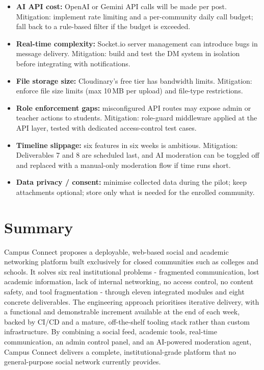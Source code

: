 \documentclass[11pt,a4paper]{article}
\begin{document}
\begin{itemize}[leftmargin=0.7cm]
    \item \textbf{AI API cost:} OpenAI or Gemini API calls will be made per post. Mitigation: implement rate limiting and a per-community daily call budget; fall back to a rule-based filter if the budget is exceeded.
    \item \textbf{Real-time complexity:} Socket.io server management can introduce bugs in message delivery. Mitigation: build and test the DM system in isolation before integrating with notifications.
    \item \textbf{File storage size:} Cloudinary's free tier has bandwidth limits. Mitigation: enforce file size limits (max 10\,MB per upload) and file-type restrictions.
    \item \textbf{Role enforcement gaps:} misconfigured API routes may expose admin or teacher actions to students. Mitigation: role-guard middleware applied at the API layer, tested with dedicated access-control test cases.
    \item \textbf{Timeline slippage:} six features in six weeks is ambitious. Mitigation: Deliverables 7 and 8 are scheduled last, and AI moderation can be toggled off and replaced with a manual-only moderation flow if time runs short.
    \item \textbf{Data privacy / consent:} minimise collected data during the pilot; keep attachments optional; store only what is needed for the enrolled community.
\end{itemize}

\section{Summary}

Campus Connect proposes a deployable, web-based social and academic networking platform built exclusively for closed communities such as colleges and schools. It solves six real institutional problems - fragmented communication, lost academic information, lack of internal networking, no access control, no content safety, and tool fragmentation - through eleven integrated modules and eight concrete deliverables. The engineering approach prioritises iterative delivery, with a functional and demonstrable increment available at the end of each week, backed by CI/CD and a mature, off-the-shelf tooling stack rather than custom infrastructure. By combining a social feed, academic tools, real-time communication, an admin control panel, and an AI-powered moderation agent, Campus Connect delivers a complete, institutional-grade platform that no general-purpose social network currently provides.
\end{document}
